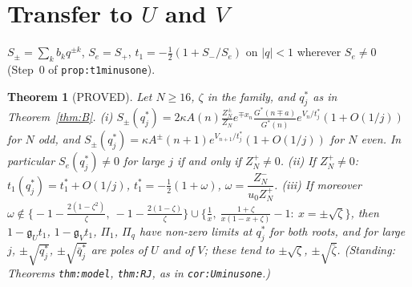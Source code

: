 \documentclass[11pt]{article}
\newtheorem{theorem}{Theorem}\newtheorem{lemma}[theorem]{Lemma}\newtheorem{proposition}[theorem]{Proposition}
\theoremstyle{definition}\newtheorem{definition}[theorem]{Definition}
\theoremstyle{remark}\newtheorem{remark}[theorem]{Remark}
\begin{document}
\section{Transfer to $U$ and $V$}\label{sec:C}
$S_\pm=\sum_kb_kq^{\pm k}$, $S_e=S_+$, $t_1=-\frac12(1+S_-/S_e)$ on $|q|<1$ wherever $S_e\ne0$ (Step~0 of \texttt{prop:t1minusone}).
\begin{theorem}[PROVED]\label{thm:C}
Let $N\ge16$, $\zeta$ in the family, and $q^*_j$ as in Theorem~\ref{thm:B}.
(i) $S_\pm(q^*_j)=2\kappa A(n)\frac{Z^\pm_N}{Z_N}e^{\mp x_n}\frac{G^*(n\mp a)}{G^*(n)}e^{V_n/t^*_j}(1+O(1/j))$ for $N$ odd, and $S_\pm(q^*_j)=\kappa A^\pm(n+1)e^{V_{n+1}/t^*_j}(1+O(1/j))$ for $N$ even. In particular $S_e(q^*_j)\ne0$ for large $j$ if and only if $Z^+_N\ne0$.
(ii) If $Z^+_N\ne0$: $t_1(q^*_j)=t_1^*+O(1/j)$, $t_1^*=-\frac12(1+\omega)$, $\omega=\dfrac{Z^-_N}{u_0Z^+_N}$.
(iii) If moreover $\omega\notin\Big\{-1-\frac{2(1-\zeta^2)}\zeta,\ -1-\frac{2(1-\zeta)}\zeta\Big\}\cup\Big\{\frac1x,\ \frac{1+\zeta}{x(1-x+\zeta)}-1:\ x=\pm\sqrt\zeta\Big\}$, then $1-\mathfrak g_Ut_1$, $1-\mathfrak g_Vt_1$, $\Pi_1$, $\Pi_q$ have non-zero limits at $q^*_j$ for both roots, and for large $j$, $\pm\sqrt{q^*_j}$, $\pm\sqrt{\bar q^*_j}$ are poles of $U$ and of $V$; these tend to $\pm\sqrt\zeta$, $\pm\sqrt{\bar\zeta}$. \textup{(Standing: Theorems \texttt{thm:model}, \texttt{thm:RJ}, as in \texttt{cor:Uminusone}.)}
\end{theorem}
\end{document}
